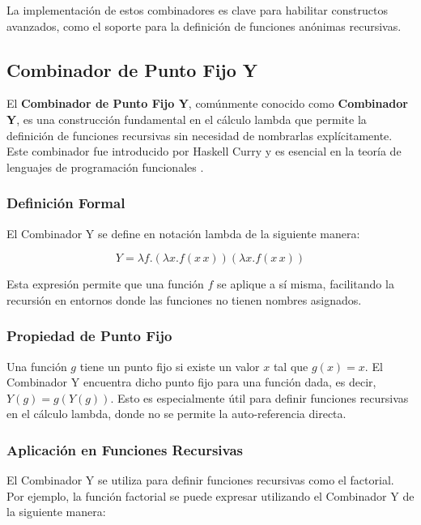 \documentclass{article}
\begin{document}
  La implementación de estos combinadores es clave para habilitar constructos avanzados, como el soporte para la definición de funciones anónimas recursivas.

  \subsection{Combinador de Punto Fijo Y}

  El \textbf{Combinador de Punto Fijo Y}, comúnmente conocido como \textbf{Combinador Y}, es una construcción fundamental en el cálculo lambda que permite la definición de funciones recursivas sin necesidad de nombrarlas explícitamente. Este combinador fue introducido por Haskell Curry y es esencial en la teoría de lenguajes de programación funcionales \cite{curry1958combinatory}.

  \subsubsection{Definición Formal}

  El Combinador Y se define en notación lambda de la siguiente manera:

  \[
  Y = \lambda f.(\lambda x.f(x \, x))(\lambda x.f(x \, x))
  \]

  Esta expresión permite que una función \( f \) se aplique a sí misma, facilitando la recursión en entornos donde las funciones no tienen nombres asignados.

  \subsubsection{Propiedad de Punto Fijo}

  Una función \( g \) tiene un punto fijo si existe un valor \( x \) tal que \( g(x) = x \). El Combinador Y encuentra dicho punto fijo para una función dada, es decir, \( Y(g) = g(Y(g)) \). Esto es especialmente útil para definir funciones recursivas en el cálculo lambda, donde no se permite la auto-referencia directa.

  \subsubsection{Aplicación en Funciones Recursivas}

  El Combinador Y se utiliza para definir funciones recursivas como el factorial. Por ejemplo, la función factorial se puede expresar utilizando el Combinador Y de la siguiente manera:
\end{document}
